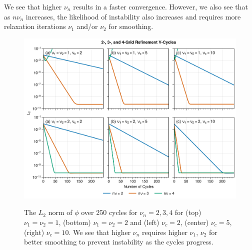 \begin{enumerate}[label=(\roman*),leftmargin=*,itemsep=0mm]
    We see that higher $\nu_n$ results in a faster convergence.  However, we also see that as $n\nu_n$ increases, the likelihood of instability also increases and requires more relaxation iterations $\nu_1$ and/or $\nu_2$ for smoothing.

    \begin{figure}[h!]
    \centering
    \includegraphics[width=\textwidth]{figures/prj1_qn2e.png}\\
    \caption{The $L_2$ norm of $\phi$ over 250 cycles for $\nu_n = 2,3,4$ for (top) $\nu_1=\nu_2=1$, (bottom) $\nu_1=\nu_2=2$ and (left) $\nu_c=2$, (center) $\nu_c=5$, (right) $\nu_c=10$.  We see that higher $\nu_n$ requires higher $\nu_1$, $\nu_2$ for better smoothing to prevent instability as the cycles progress.}
    \label{prj1_qn2e}
    \end{figure}
    
\end{enumerate}